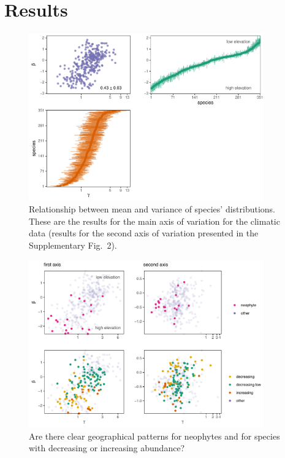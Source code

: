 \documentclass[11pt, a4paper]{article}
\begin{document}
\section*{Results}
\begin{figure}[ht]
  \centering
    \vspace{0.5cm}
    \includegraphics[width=0.9\textwidth]{figures/figure1}
    	  \vspace{0.3cm}
	   \caption{Relationship between mean and variance of species' distributions. These are the results for the main axis of variation for the climatic data (results for the second axis of variation presented in the Supplementary Fig.~2).}
      \label{fig:correlation}
\end{figure}

\begin{figure}[h]
  \centering
    \vspace{0.5cm}
    \includegraphics[width=0.9\textwidth]{figures/invasive}
    	  \vspace{0.3cm}
	   \caption{Are there clear geographical patterns for neophytes and for species with decreasing or increasing abundance?}
      \label{fig:neophytes}
\end{figure}

\clearpage

\end{document}
